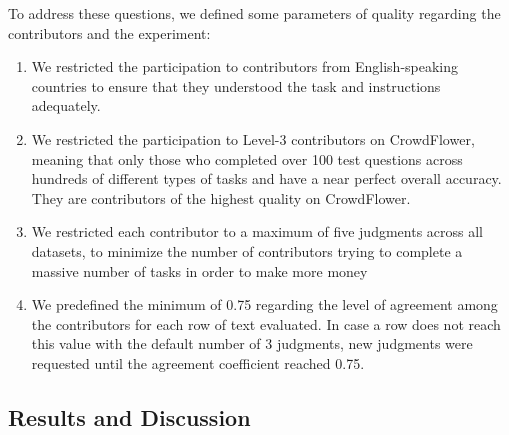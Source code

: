  
To address these questions, we defined some parameters of quality regarding the contributors and the experiment:

\begin{enumerate}

\item We restricted the participation to contributors from English-speaking countries to ensure that they understood the task and instructions adequately. 

\item We restricted the participation to Level-3 contributors on CrowdFlower, meaning that only those who completed over 100 test questions across hundreds of different types of tasks and have a near perfect overall accuracy. They are contributors of the highest quality on CrowdFlower.

\item We restricted each contributor to a maximum of five judgments across all datasets, to minimize the number of contributors trying to complete a massive number of tasks in order to make more money 

\item We predefined the minimum of 0.75 regarding the level of agreement among the contributors for each row of text evaluated. In case a row does not reach this value with the default number of 3 judgments, new judgments were requested until the agreement coefficient reached 0.75.

\end{enumerate}

\subsection{\hspace*{3pt} Results and Discussion}



